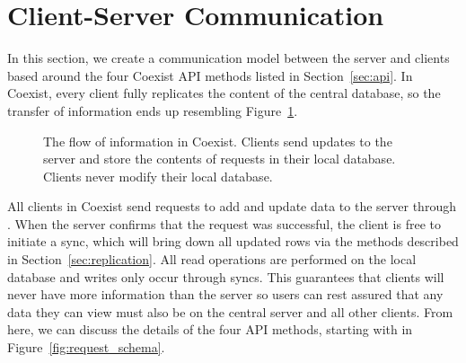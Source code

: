 \section{Client-Server Communication} \label{sec:communication}

In this section, we create a communication model between the server and clients
based around the four Coexist API methods listed in Section~\ref{sec:api}. In
Coexist, every client fully replicates the content of the central database, so
the transfer of information ends up resembling Figure~\ref{fig:mirror}.


\begin{figure}[h!]
\centering
{}
\caption{The flow of information in Coexist. Clients send updates to the server
and store the contents of requests in their local database. Clients never modify
their local database.}
\label{fig:mirror}
\end{figure}

All clients in Coexist send requests to add and update data to the server
through \create. When the server confirms that the request was successful, the
client is free to initiate a sync, which will bring down all updated rows via
the methods described in Section~\ref{sec:replication}. All read operations are
performed on the local database and writes only occur through syncs. This
guarantees that clients will never have more information than the server so
users can rest assured that any data they can view must also be on the central
server and all other clients. From here, we can discuss the details of the four
API methods, starting with \schema in Figure~\ref{fig:request_schema}. 



